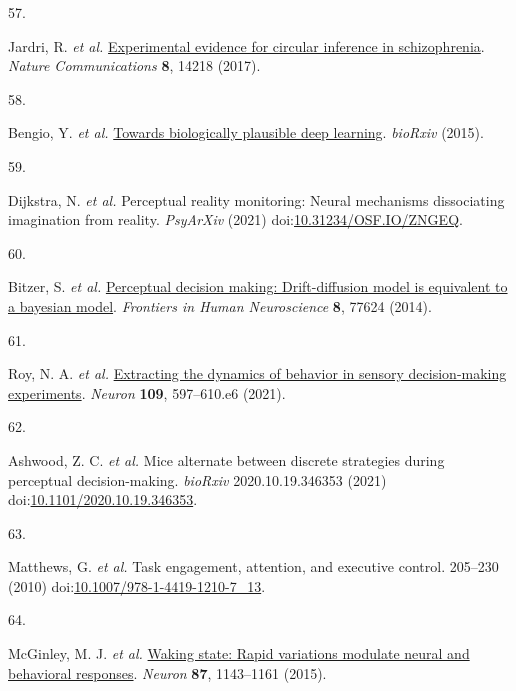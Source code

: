 \documentclass[
]{article}
\newlength{\cslhangindent}
\newlength{\csllabelwidth}
\newlength{\cslentryspacingunit} %
\newenvironment{CSLReferences}[2] %
 {%
  \setlength{\parindent}{0pt}
  \ifodd #1
  \let\oldpar\par
  \def\par{\hangindent=\cslhangindent\oldpar}
  \fi
  \setlength{\parskip}{#2\cslentryspacingunit}
 }%
 {}
\newcommand{\CSLLeftMargin}[1]{\parbox[t]{\csllabelwidth}{#1}}
\newcommand{\CSLRightInline}[1]{\parbox[t]{\linewidth - \csllabelwidth}{#1}\break}
\begin{document}
\begin{CSLReferences}{0}{0}
\leavevmode{}%
\CSLLeftMargin{57. }%
\CSLRightInline{Jardri, R. \emph{et al.}
\href{https://doi.org/10.1038/ncomms14218}{Experimental evidence for
circular inference in schizophrenia}. \emph{Nature Communications}
\textbf{8}, 14218 (2017).}

\leavevmode{}%
\CSLLeftMargin{58. }%
\CSLRightInline{Bengio, Y. \emph{et al.}
\href{http://arxiv.org/abs/1502.04156}{Towards biologically plausible
deep learning}. \emph{bioRxiv} (2015).}

\leavevmode{}%
\CSLLeftMargin{59. }%
\CSLRightInline{Dijkstra, N. \emph{et al.} Perceptual reality
monitoring: Neural mechanisms dissociating imagination from reality.
\emph{PsyArXiv} (2021)
doi:\href{https://doi.org/10.31234/OSF.IO/ZNGEQ}{10.31234/OSF.IO/ZNGEQ}.}

\leavevmode{}%
\CSLLeftMargin{60. }%
\CSLRightInline{Bitzer, S. \emph{et al.}
\href{https://doi.org/10.3389/FNHUM.2014.00102/BIBTEX}{Perceptual
decision making: Drift-diffusion model is equivalent to a bayesian
model}. \emph{Frontiers in Human Neuroscience} \textbf{8}, 77624
(2014).}

\leavevmode{}%
\CSLLeftMargin{61. }%
\CSLRightInline{Roy, N. A. \emph{et al.}
\href{https://doi.org/10.1016/J.NEURON.2020.12.004}{Extracting the
dynamics of behavior in sensory decision-making experiments}.
\emph{Neuron} \textbf{109}, 597--610.e6 (2021).}

\leavevmode{}%
\CSLLeftMargin{62. }%
\CSLRightInline{Ashwood, Z. C. \emph{et al.} Mice alternate between
discrete strategies during perceptual decision-making. \emph{bioRxiv}
2020.10.19.346353 (2021)
doi:\href{https://doi.org/10.1101/2020.10.19.346353}{10.1101/2020.10.19.346353}.}

\leavevmode{}%
\CSLLeftMargin{63. }%
\CSLRightInline{Matthews, G. \emph{et al.} Task engagement, attention,
and executive control. 205--230 (2010)
doi:\href{https://doi.org/10.1007/978-1-4419-1210-7_13}{10.1007/978-1-4419-1210-7\_13}.}

\leavevmode{}%
\CSLLeftMargin{64. }%
\CSLRightInline{McGinley, M. J. \emph{et al.}
\href{https://doi.org/10.1016/j.neuron.2015.09.012}{Waking state: Rapid
variations modulate neural and behavioral responses}. \emph{Neuron}
\textbf{87}, 1143--1161 (2015).}


\end{CSLReferences}
\end{document}
